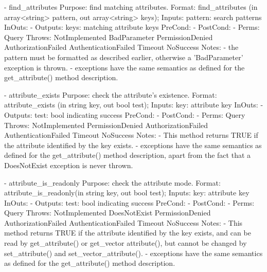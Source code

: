 \begin{myspec}
 
    - find_attributes
      Purpose:  find matching attributes.
      Format:   find_attributes      (in  array<string>   pattern,
                                      out array<string>   keys);
      Inputs:   pattern:              search patterns
      InOuts:   -
      Outputs:  keys:                 matching attribute keys
      PreCond:  -
      PostCond: -
      Perms:    Query
      Throws:   NotImplemented
                BadParameter
                PermissionDenied
                AuthorizationFailed
                AuthenticationFailed
                Timeout
                NoSuccess
      Notes:    - the pattern must be formatted as described 
                  earlier, otherwise a 'BadParameter' exception 
                  is thrown. 
                - exceptions have the same semantics as defined
                  for the get_attribute() method description.
 
 
    - attribute_exists
      Purpose:  check the attribute's existence.
      Format:   attribute_exists     (in  string key,
                                      out bool   test);
      Inputs:   key:                  attribute key
      InOuts:   -
      Outputs:  test:                 bool indicating success
      PreCond:  -
      PostCond: -
      Perms:    Query
      Throws:   NotImplemented
                PermissionDenied
                AuthorizationFailed
                AuthenticationFailed
                Timeout
                NoSuccess
      Notes:    - This method returns TRUE if the attribute
                  identified by the key exists.
                - exceptions have the same semantics as defined
                  for the get_attribute() method description, 
                  apart from the fact that a DoesNotExist
                  exception is never thrown.
 
 
    - attribute_is_readonly
      Purpose:  check the attribute mode.
      Format:   attribute_is_readonly(in  string key,
                                      out bool   test);
      Inputs:   key:                  attribute key
      InOuts:   -
      Outputs:  test:                 bool indicating success
      PreCond:  -
      PostCond: -
      Perms:    Query
      Throws:   NotImplemented
                DoesNotExist
                PermissionDenied
                AuthorizationFailed
                AuthenticationFailed
                Timeout
                NoSuccess
      Notes:    - This method returns TRUE if the attribute
                  identified by the key exists, and can be read
                  by get_attribute() or get_vector attribute(),
                  but cannot be changed by set_attribute() and
                  set_vector_attribute().
                - exceptions have the same semantics as defined
                  for the get_attribute() method description.
 

\end{myspec}
